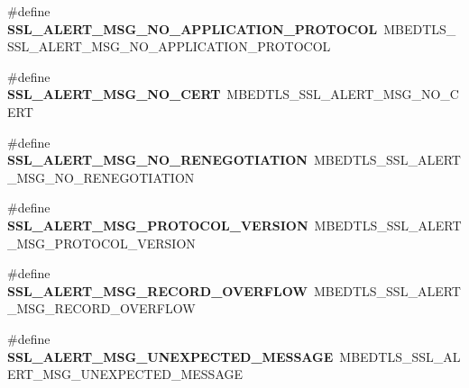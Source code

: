 \begin{DoxyCompactItemize}
\mbox{\label{compat-1_83_8h_aa2e1d7e2cad0ef4fa4b2bf05b548d69c}} 
\#define {\bfseries S\+S\+L\+\_\+\+A\+L\+E\+R\+T\+\_\+\+M\+S\+G\+\_\+\+N\+O\+\_\+\+A\+P\+P\+L\+I\+C\+A\+T\+I\+O\+N\+\_\+\+P\+R\+O\+T\+O\+C\+OL}~M\+B\+E\+D\+T\+L\+S\+\_\+\+S\+S\+L\+\_\+\+A\+L\+E\+R\+T\+\_\+\+M\+S\+G\+\_\+\+N\+O\+\_\+\+A\+P\+P\+L\+I\+C\+A\+T\+I\+O\+N\+\_\+\+P\+R\+O\+T\+O\+C\+OL
\item 
\mbox{\label{compat-1_83_8h_aa39058a5209b2dc80ce6ed78df88ac1e}} 
\#define {\bfseries S\+S\+L\+\_\+\+A\+L\+E\+R\+T\+\_\+\+M\+S\+G\+\_\+\+N\+O\+\_\+\+C\+E\+RT}~M\+B\+E\+D\+T\+L\+S\+\_\+\+S\+S\+L\+\_\+\+A\+L\+E\+R\+T\+\_\+\+M\+S\+G\+\_\+\+N\+O\+\_\+\+C\+E\+RT
\item 
\mbox{\label{compat-1_83_8h_a575935e3c2a919ac2600e9f4f1ea27bb}} 
\#define {\bfseries S\+S\+L\+\_\+\+A\+L\+E\+R\+T\+\_\+\+M\+S\+G\+\_\+\+N\+O\+\_\+\+R\+E\+N\+E\+G\+O\+T\+I\+A\+T\+I\+ON}~M\+B\+E\+D\+T\+L\+S\+\_\+\+S\+S\+L\+\_\+\+A\+L\+E\+R\+T\+\_\+\+M\+S\+G\+\_\+\+N\+O\+\_\+\+R\+E\+N\+E\+G\+O\+T\+I\+A\+T\+I\+ON
\item 
\mbox{\label{compat-1_83_8h_a368e71bd5a946294a83aa59d121a5680}} 
\#define {\bfseries S\+S\+L\+\_\+\+A\+L\+E\+R\+T\+\_\+\+M\+S\+G\+\_\+\+P\+R\+O\+T\+O\+C\+O\+L\+\_\+\+V\+E\+R\+S\+I\+ON}~M\+B\+E\+D\+T\+L\+S\+\_\+\+S\+S\+L\+\_\+\+A\+L\+E\+R\+T\+\_\+\+M\+S\+G\+\_\+\+P\+R\+O\+T\+O\+C\+O\+L\+\_\+\+V\+E\+R\+S\+I\+ON
\item 
\mbox{\label{compat-1_83_8h_abafde3870ba4e25a83e8f73fa8c32246}} 
\#define {\bfseries S\+S\+L\+\_\+\+A\+L\+E\+R\+T\+\_\+\+M\+S\+G\+\_\+\+R\+E\+C\+O\+R\+D\+\_\+\+O\+V\+E\+R\+F\+L\+OW}~M\+B\+E\+D\+T\+L\+S\+\_\+\+S\+S\+L\+\_\+\+A\+L\+E\+R\+T\+\_\+\+M\+S\+G\+\_\+\+R\+E\+C\+O\+R\+D\+\_\+\+O\+V\+E\+R\+F\+L\+OW
\item 
\mbox{\label{compat-1_83_8h_a39c9318d0549bab6c227ecd0d70f035c}} 
\#define {\bfseries S\+S\+L\+\_\+\+A\+L\+E\+R\+T\+\_\+\+M\+S\+G\+\_\+\+U\+N\+E\+X\+P\+E\+C\+T\+E\+D\+\_\+\+M\+E\+S\+S\+A\+GE}~M\+B\+E\+D\+T\+L\+S\+\_\+\+S\+S\+L\+\_\+\+A\+L\+E\+R\+T\+\_\+\+M\+S\+G\+\_\+\+U\+N\+E\+X\+P\+E\+C\+T\+E\+D\+\_\+\+M\+E\+S\+S\+A\+GE
\item 
\mbox{\label{compat-1_83_8h_aca99d76eb4973ab3f738810886a736f5}} 

\end{DoxyCompactItemize}
